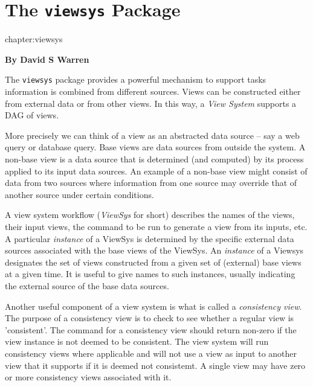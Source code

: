 

\chapter{The {\tt viewsys} Package}{chapter:viewsys}

  \begin{center}
    {\Large {\bf By David S Warren}}
  \end{center}

The {\tt viewsys} package provides a powerful mechanism to support
tasks information is combined from different sources.  Views can be
constructed either from external data or from other views.  In this
way, a {\em View System} supports a DAG of views.


More precisely we can think of a view as an abstracted data source --
say a web query or database query.  Base views are data sources from
outside the system.  A non-base view is a data source that is
determined (and computed) by its process applied to its input data
sources.  An example of a non-base view might consist of data from two
sources where information from one source may override that of another
source under certain conditions.


A view system workflow ({\em ViewSys} for short) describes the names
of the views, their input views, the command to be run to generate a
view from its inputs, etc.  A particular {\em instance} of a ViewSys
is determined by the specific external data sources associated with
the base views of the ViewSys.  An {\em instance} of a Viewsys
designates the set of views constructed from a given set of (external)
base views at a given time.  It is useful to give names to such
instances, usually indicating the external source of the base data
sources.  

Another useful component of a view system is what is called a {\em
  consistency view}.  The purpose of a consistency view is to check to
see whether a regular view is 'consistent'.  The command for a
consistency view should return non-zero if the view instance is not
deemed to be consistent.
%
The view system will run consistency views where applicable and will
not use a view as input to another view that it supports if it is
deemed not consistemt.  A single view may have zero or more
consistency views associated with it.

